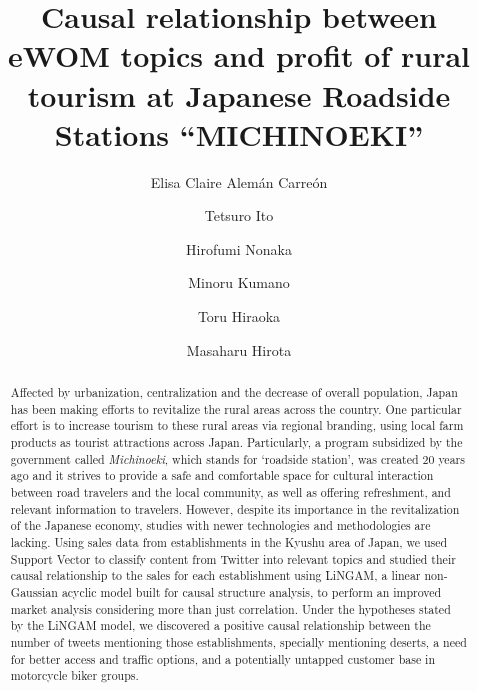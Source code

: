 \documentclass[review]{elsarticle}
\begin{document}
\begin{frontmatter}

\title{Causal relationship between eWOM topics and profit of rural tourism at Japanese Roadside Stations “MICHINOEKI”}

\author[gidai]{Elisa Claire Alem\'an Carre\'on
}

\author[gidai]{Tetsuro Ito}

\author[gidai]{Hirofumi Nonaka}

\author[miyazaki]{Minoru Kumano}

\author[nagasaki]{Toru Hiraoka}

\author[okayama]{Masaharu Hirota}

\address[gidai]{Nagaoka University of Technology, Nagaoka, Japan}
\address[miyazaki]{University of Miyazaki, Miyazaki, Japan}
\address[nagasaki]{University of Nagasaki, Nagasaki, Japan}
\address[okayama]{Okayama University of Science, Okayama, Japan}


\begin{abstract}

Affected by urbanization, centralization and the decrease of overall population, Japan has been making efforts to revitalize the rural areas across the country. One particular effort is to increase tourism to these rural areas via regional branding, using local farm products as tourist attractions across Japan. Particularly, a program subsidized by the government called \textit{Michinoeki}, which stands for ‘roadside station’, was created 20 years ago and it strives to provide a safe and comfortable space for cultural interaction between road travelers and the local community, as well as offering refreshment, and relevant information to travelers. However, despite its importance in the revitalization of the Japanese economy, studies with newer technologies and methodologies are lacking. Using sales data from establishments in the Kyushu area of Japan, we used Support Vector to classify content from Twitter into relevant topics and studied their causal relationship to the sales for each establishment using LiNGAM, a linear non-Gaussian acyclic model built for causal structure analysis, to perform an improved market analysis considering more than just correlation. Under the hypotheses stated by the LiNGAM model, we discovered a positive causal relationship between the number of tweets mentioning those establishments, specially mentioning deserts, a need for better access and traffic options, and a potentially untapped customer base in motorcycle biker groups. 


\end{abstract}
\end{frontmatter}
\end{document}
